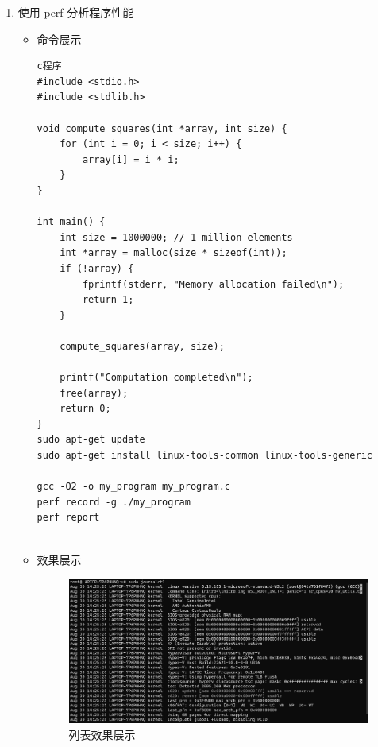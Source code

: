 \documentclass[UTF8]{ctexart}
\begin{document}
\begin{enumerate}
  \item 使用 perf 分析程序性能
  \begin{itemize}
  \item 命令展示
  \begin{verbatim}
c程序
#include <stdio.h>
#include <stdlib.h>

void compute_squares(int *array, int size) {
    for (int i = 0; i < size; i++) {
        array[i] = i * i;
    }
}

int main() {
    int size = 1000000; // 1 million elements
    int *array = malloc(size * sizeof(int));
    if (!array) {
        fprintf(stderr, "Memory allocation failed\n");
        return 1;
    }

    compute_squares(array, size);

    printf("Computation completed\n");
    free(array);
    return 0;
}
sudo apt-get update
sudo apt-get install linux-tools-common linux-tools-generic

gcc -O2 -o my_program my_program.c
perf record -g ./my_program
perf report


  \end{verbatim}
\item 效果展示
  \begin{figure}[H]
    \centering
    \includegraphics[width=\textwidth]{111} %
    \caption{列表效果展示}
  \end{figure}
  \end{itemize}
\end{enumerate}





\end{document}
